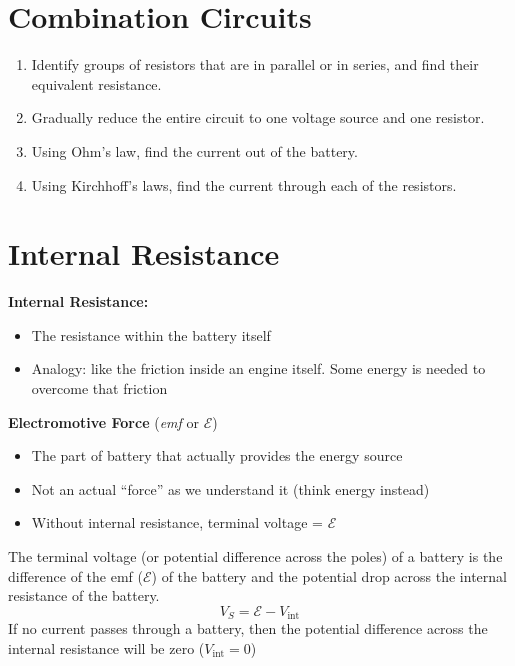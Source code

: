 \section{Combination Circuits}
\begin{enumerate}
\item Identify groups of resistors that are in parallel or in series, and
  find their equivalent resistance.
\item Gradually reduce the entire circuit to one voltage source and one
  resistor.
\item Using Ohm's law, find the current out of the battery.
\item Using Kirchhoff's laws, find the current through each of the resistors.
\end{enumerate}




\section{Internal Resistance}

\textbf{Internal Resistance:}
\begin{itemize}
\item The resistance within the battery itself
\item Analogy: like the friction inside an engine itself. Some energy is
  needed to overcome that friction
\end{itemize}
\textbf{Electromotive Force} (\emph{emf} or $\mathcal E$)
\begin{itemize}
\item The part of battery that actually provides the energy source
\item Not an actual ``force'' as we understand it (think energy instead)
\item Without internal resistance, terminal voltage = $\mathcal E$
\end{itemize}
%
%
%
%
The terminal voltage (or potential difference across the poles) of a battery
is the difference of the emf ($\mathcal E$) of the battery and the potential
drop across the internal resistance of the battery.
\begin{equation}
  \boxed{V_S = \mathcal{E}-V_\text{int}}
\end{equation}
If no current passes through a battery, then the potential difference across
the internal resistance will be zero ($V_\text{int}=0$)

